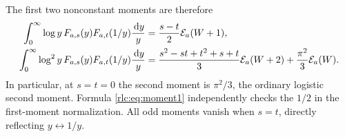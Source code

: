 The first two nonconstant moments are therefore
\begin{align}
 \int_0^\infty\log y\,F_{a,s}(y)F_{a,t}(1/y)\frac{\,\mathrm d y}{y}
 &=\frac{s-t}{2}\mathcal E_a(W+1),\label{rlc:eq:moment1}\\
 \int_0^\infty\log^2 y\,F_{a,s}(y)F_{a,t}(1/y)\frac{\,\mathrm d y}{y}
 &=\frac{s^2-st+t^2+s+t}{3}\mathcal E_a(W+2)
      +\frac{\pi^2}{3}\mathcal E_a(W).
 \label{rlc:eq:moment2}
\end{align}
In particular, at $s=t=0$ the second moment is $\pi^2/3$, the ordinary
logistic second moment. Formula \eqref{rlc:eq:moment1} independently
checks the $1/2$ in the first-moment normalization. All odd moments
vanish when $s=t$, directly reflecting $y\leftrightarrow1/y$.
